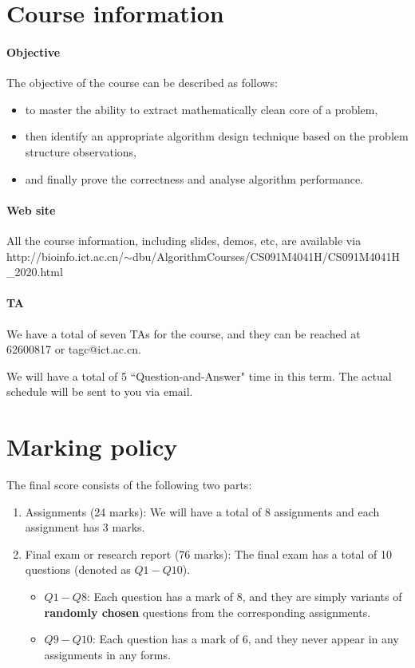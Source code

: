 \documentclass[12pt]{article}
\begin{document}
\maketitle
\newpage

\section{Course information}
\paragraph{Objective}
The objective of the course can be described as follows: 
\begin{itemize} 
\item  to master the ability to extract mathematically clean core of a problem, 
\item then identify an appropriate algorithm design technique based on the problem structure observations, 
\item  and finally prove the correctness and analyse algorithm performance. 
\end{itemize} 
\paragraph{Web site} 
All the course information, including slides, demos, etc, are available via http://bioinfo.ict.ac.cn/$\sim$dbu/AlgorithmCourses/CS091M4041H/CS091M4041H \_2020.html
\paragraph{TA}
We have a total of seven TAs for the course, and they can be reached at 62600817 or tagc@ict.ac.cn. 

We will have a total of 5 ``Question-and-Answer" time in this term. The actual schedule will be sent to you via email. 

\section{Marking policy}
The final score consists  of the following two parts: 
\begin{enumerate}
\item Assignments (24 marks):  We will have a total of 8 assignments and each assignment has 3 marks.  
\item Final exam or research report (76 marks): The final exam has a total of 10 questions (denoted as $Q1-Q10$). 
\begin{itemize} 
\item $Q1-Q8$: Each question has a mark of 8, and they are simply variants of {\bf randomly chosen} questions from the corresponding assignments. 
\item $Q9-Q10$: Each question has a mark of 6, and they never appear in any assignments in any forms. 
\end{itemize} 
\end{enumerate}
\end{document}

